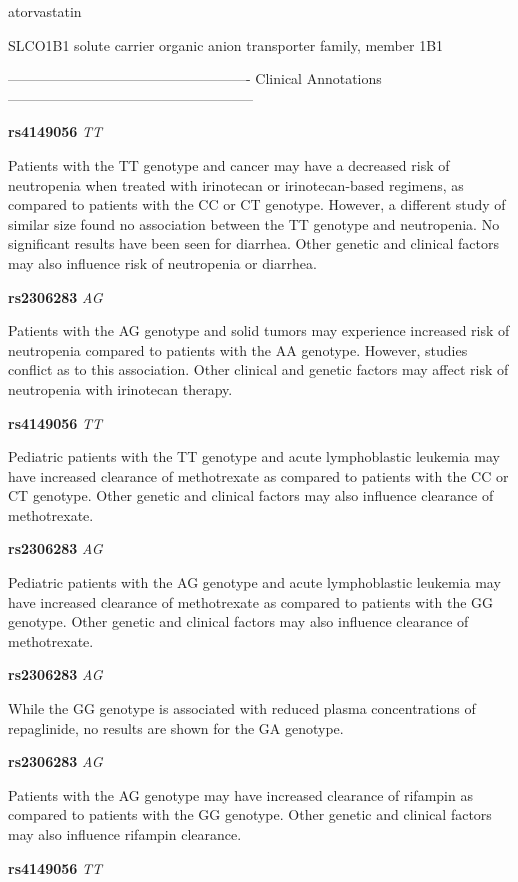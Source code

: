 \documentclass{resume} %
\begin{document}
\begin{rSection}{ atorvastatin }
\begin{rSubsection}{ SLCO1B1 }{ solute carrier organic anion transporter family, member 1B1 }{}{}
\item[] ---------------------------------------------------- Clinical Annotations -----------------------------------------------------\newline
\item \textbf{ rs4149056 } \textit{ TT }
\item[] Patients with the TT genotype and cancer may have a decreased risk of neutropenia when treated with irinotecan or irinotecan-based regimens, as compared to patients with the CC or CT genotype. However, a different study of similar size found no association between the TT genotype and neutropenia. No significant results have been seen for diarrhea. Other genetic and clinical factors may also influence risk of neutropenia or diarrhea.\item \textbf{ rs2306283 } \textit{ AG }
\item[] Patients with the AG genotype and solid tumors may experience increased risk of neutropenia compared to patients with the AA genotype. However, studies conflict as to this association. Other clinical and genetic factors may affect risk of neutropenia with irinotecan therapy.\item \textbf{ rs4149056 } \textit{ TT }
\item[] Pediatric patients with the TT genotype and acute lymphoblastic leukemia may have increased clearance of methotrexate as compared to patients with the CC or CT genotype. Other genetic and clinical factors may also influence clearance of methotrexate.\item \textbf{ rs2306283 } \textit{ AG }
\item[] Pediatric patients with the AG genotype and acute lymphoblastic leukemia may have increased clearance of methotrexate as compared to patients with the GG genotype. Other genetic and clinical factors may also influence clearance of methotrexate. \item \textbf{ rs2306283 } \textit{ AG }
\item[] While the GG genotype is associated with reduced plasma concentrations of repaglinide, no results are shown for the GA genotype.\item \textbf{ rs2306283 } \textit{ AG }
\item[] Patients with the AG genotype may have increased clearance of rifampin as compared to patients with the GG genotype. Other genetic and clinical factors may also influence rifampin clearance. \item \textbf{ rs4149056 } \textit{ TT }

\end{rSubsection}
\end{rSection}
\end{document}
